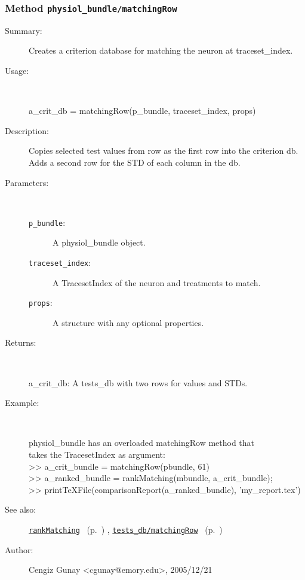 \subsubsection[Method \texttt{matchingRow}]{Method \texttt{physiol\_bundle/matchingRow}}%
%
\label{ref_physiol_bundle__matchingRow}%
\hypertarget{ref_physiol_bundle__matchingRow}{}%
\begin{description}
\item[Summary:]Creates a criterion database for matching the neuron at traceset\_index.
%
\item[Usage:]~%
\begin{lyxcode}%
a\_crit\_db = matchingRow(p\_bundle, traceset\_index, props)
%
\end{lyxcode}%
%
\item[Description:]%
Copies selected test values from row as the first row into the 
 criterion db. Adds a second row for the STD of each column in the db.
\item[Parameters:]~
\begin{description}%
\item[\texttt{p\_bundle}:]
 A physiol\_bundle object.
\item[\texttt{traceset\_index}:]
 A TracesetIndex of the neuron and treatments to match.
\item[\texttt{props}:]
 A structure with any optional properties.
\end{description}%
%
\item[Returns:]~

	a\_crit\_db: A tests\_db with two rows for values and STDs.
%
\item[Example:]~
\begin{lyxcode}        physiol\_bundle has an overloaded matchingRow method that\\%
        takes the TracesetIndex as argument:\\%
        >> a\_crit\_bundle = matchingRow(pbundle, 61)\\%
        >> a\_ranked\_bundle = rankMatching(mbundle, a\_crit\_bundle);\\%
        >> printTeXFile(comparisonReport(a\_ranked\_bundle), 'my\_report.tex')\\%
\end{lyxcode}
%
\item[See also:]%
\hyperlink{ref_rankMatching}{\texttt{rankMatching}}%
\ (p.~\pageref{ref_rankMatching})%
%
, \hyperlink{ref_tests_db__matchingRow}{\texttt{tests\_db/matchingRow}}%
\ (p.~\pageref{ref_tests_db__matchingRow})%
%
%
\item[Author:]%
Cengiz Gunay <cgunay@emory.edu>, 2005/12/21%
\end{description}
\methodline%
